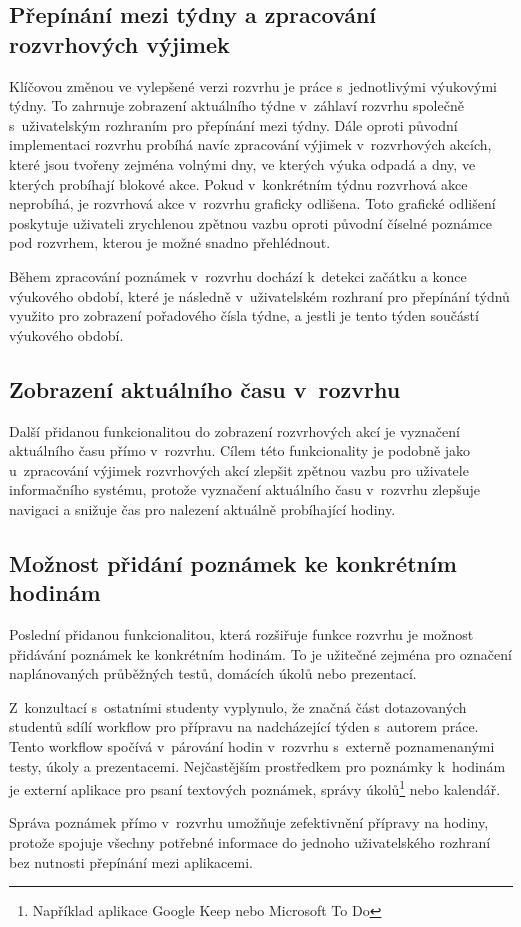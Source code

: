 \subsection{Přepínání mezi týdny a zpracování rozvrhových výjimek}

Klíčovou změnou ve vylepšené verzi rozvrhu je práce s~jednotlivými výukovými týdny. To zahrnuje zobrazení aktuálního týdne v~záhlaví rozvrhu společně s~uživatelským rozhraním pro přepínání mezi týdny. Dále oproti původní implementaci rozvrhu probíhá navíc zpracování výjimek v~rozvrhových akcích, které jsou tvořeny zejména volnými dny, ve kterých výuka odpadá a dny, ve kterých probíhají blokové akce. Pokud v~konkrétním týdnu rozvrhová akce neprobíhá, je rozvrhová akce v~rozvrhu graficky odlišena. Toto grafické odlišení poskytuje uživateli zrychlenou zpětnou vazbu oproti původní číselné poznámce pod rozvrhem, kterou je možné snadno přehlédnout.

Během zpracování poznámek v~rozvrhu dochází k~detekci začátku a konce výukového období, které je následně v~uživatelském rozhraní pro přepínání týdnů využito pro zobrazení pořadového čísla týdne, a jestli je tento týden součástí výukového období.

\subsection{Zobrazení aktuálního času v~rozvrhu}

Další přidanou funkcionalitou do zobrazení rozvrhových akcí je vyznačení aktuálního času přímo v~rozvrhu. Cílem této funkcionality je podobně jako u~zpracování výjimek rozvrhových akcí zlepšit zpětnou vazbu pro uživatele informačního systému, protože vyznačení aktuálního času v~rozvrhu zlepšuje navigaci a snižuje čas pro nalezení aktuálně probíhající hodiny. 

\subsection{Možnost přidání poznámek ke konkrétním hodinám}

Poslední přidanou funkcionalitou, která rozšiřuje funkce rozvrhu je možnost přidávání poznámek ke konkrétním hodinám. To je užitečné zejména pro označení naplánovaných průběžných testů, domácích úkolů nebo prezentací. 

Z~konzultací s~ostatními studenty vyplynulo, že značná část dotazovaných studentů sdílí workflow pro přípravu na nadcházející týden s~autorem práce. Tento workflow spočívá v~párování hodin v~rozvrhu s~externě poznamenanými testy, úkoly a prezentacemi. Nejčastějším prostředkem pro poznámky k~hodinám je externí aplikace pro psaní textových poznámek, správy úkolů\footnote{Například aplikace Google Keep nebo Microsoft To Do} nebo kalendář.

Správa poznámek přímo v~rozvrhu umožňuje zefektivnění přípravy na hodiny, protože spojuje všechny potřebné informace do jednoho uživatelského rozhraní bez nutnosti přepínání mezi aplikacemi.
